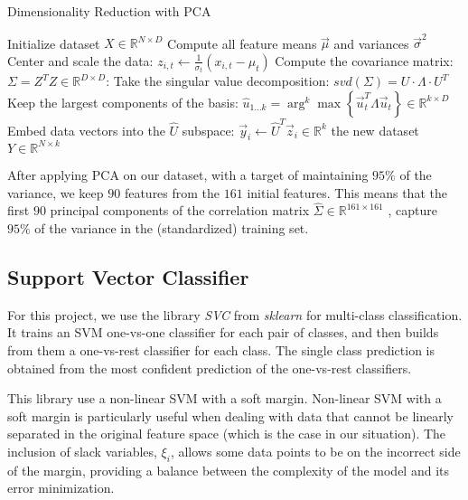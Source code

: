 \documentclass[twocolumn]{article}
\begin{document}
\begin{algorithm}
\caption{Dimensionality Reduction with PCA}
\begin{algorithmic}[1]
\State Initialize dataset $X \in \mathbb{R}^{N \times D}$
\State Compute all feature means $\Vec{\mu}$ and variances $\Vec{\sigma}^2$
\Statex Center and scale the data:
    \State $z_{i,t} \gets \frac{1}{\sigma_t}(x_{i,t} - \mu_t)$
\EndFor
\Statex Compute the covariance matrix:
\State $\Sigma = Z^TZ \in \mathbb{R}^{D \times D}$:
\Statex Take the singular value decomposition:
\State $svd(\Sigma) = U \cdot \Lambda \cdot U^T$
\Statex Keep the largest components of the basis:
\State $\hat{u}_{1 \dots k} = \arg^k \max \left\{ \Vec{u}_t^T \Lambda \Vec{u}_t \right\} \in \mathbb{R}^{k \times D}$
\Statex Embed data vectors into the $\hat{U}$ subspace:
    \State $\Vec{y}_i \gets \hat{U}^T \Vec{z}_i \in \mathbb{R}^k$
\EndFor
\State \Return the new dataset $Y \in \mathbb{R}^{N \times k}$
\end{algorithmic}
\end{algorithm}

After applying PCA on our dataset, with a target of maintaining $95\%$ of the variance, we keep $90$ features from the $161$ initial features. This means that the first $90$ principal components of the correlation matrix $\hat{\Sigma} \in \mathbb{R}^{161 \times 161}$ , capture $95\%$ of the variance in the (standardized) training set.

\subsection{Support Vector Classifier}
For this project, we use the library \textit{SVC} from \textit{sklearn} for multi-class classification. It trains an SVM one-vs-one classifier for each pair of classes, and then builds from them a one-vs-rest classifier for each class. The single class prediction is obtained from the most confident prediction of the one-vs-rest classifiers. 

This library use a non-linear SVM with a soft margin. Non-linear SVM with a soft margin is particularly useful when dealing with data that cannot be linearly separated in the original feature space (which is the case in our situation). The inclusion of slack variables, \(\xi_i\), allows some data points to be on the incorrect side of the margin, providing a balance between the complexity of the model and its error minimization.\\
\end{document}
